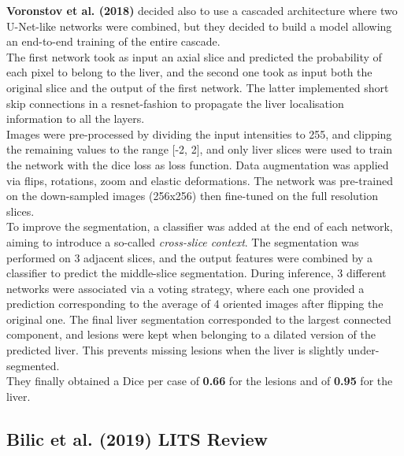 \textbf{Voronstov et al. (2018)} decided also to use a cascaded
architecture where two U-Net-like networks were combined, but they
decided to build a model allowing an end-to-end training of the entire
cascade.\\
The first network took as input an axial slice and predicted the
probability of each pixel to belong to the liver, and the second one
took as input both the original slice and the output of the first
network. The latter implemented short skip connections in a
resnet-fashion to propagate the liver localisation information to all
the layers.\\
Images were pre-processed by dividing the input intensities to 255, and
clipping the remaining values to the range {[}-2, 2{]}, and only liver
slices were used to train the network with the dice loss as loss
function.
Data augmentation was applied via flips, rotations, zoom and elastic
deformations.
The network was pre-trained on the down-sampled images (256x256) then
fine-tuned on the full resolution slices.\\
To improve the segmentation, a classifier was added at the end of each
network, aiming to introduce a so-called \emph{cross-slice context}. The
segmentation was performed on 3 adjacent slices, and the output features
were combined by a classifier to predict the middle-slice segmentation.
During inference, 3 different networks were associated via a voting
strategy, where each one provided a prediction corresponding to the
average of 4 oriented images after flipping the original one.
The final liver segmentation corresponded to the largest connected
component, and lesions were kept when belonging to a dilated version of
the predicted liver. This prevents missing lesions when the liver is
slightly under-segmented.\\
They finally obtained a Dice per case of \textbf{0.66} for the lesions
and of \textbf{0.95} for the liver.

\subsection*{Bilic et al. (2019) LITS
Review}\label{bilic-et-al.-2019-lits-review}

